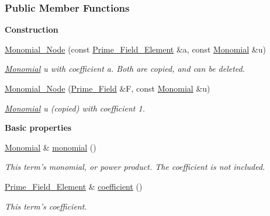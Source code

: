 \subsubsection*{Public Member Functions}
\begin{Indent}\textbf{ Construction}\par
\begin{DoxyCompactItemize}
\item 
\mbox{\label{group__polygroup_af979446eca6482aa603a53681a0c1ce9}} 
\hyperlink{group__polygroup_af979446eca6482aa603a53681a0c1ce9}{Monomial\+\_\+\+Node} (const \hyperlink{group___fields_group_class_prime___field___element}{Prime\+\_\+\+Field\+\_\+\+Element} \&a, const \hyperlink{group__polygroup_class_monomial}{Monomial} \&u)
\begin{DoxyCompactList}\small\item\em \hyperlink{group__polygroup_class_monomial}{Monomial} u with coefficient a. Both are copied, and can be deleted. \end{DoxyCompactList}\item 
\mbox{\label{group__polygroup_a4de7838dc51013c36fe23831249a8096}} 
\hyperlink{group__polygroup_a4de7838dc51013c36fe23831249a8096}{Monomial\+\_\+\+Node} (\hyperlink{group___fields_group_class_prime___field}{Prime\+\_\+\+Field} \&F, const \hyperlink{group__polygroup_class_monomial}{Monomial} \&u)
\begin{DoxyCompactList}\small\item\em \hyperlink{group__polygroup_class_monomial}{Monomial} u (copied) with coefficient 1. \end{DoxyCompactList}\end{DoxyCompactItemize}
\end{Indent}
\begin{Indent}\textbf{ Basic properties}\par
\begin{DoxyCompactItemize}
\item 
\mbox{\label{group__polygroup_ae2de10486486a056aa860ae8f133c309}} 
\hyperlink{group__polygroup_class_monomial}{Monomial} \& \hyperlink{group__polygroup_ae2de10486486a056aa860ae8f133c309}{monomial} ()
\begin{DoxyCompactList}\small\item\em This term's monomial, or power product. The coefficient is not included. \end{DoxyCompactList}\item 
\mbox{\label{group__polygroup_a9eaedcc01e0c081565981450d08379f4}} 
\hyperlink{group___fields_group_class_prime___field___element}{Prime\+\_\+\+Field\+\_\+\+Element} \& \hyperlink{group__polygroup_a9eaedcc01e0c081565981450d08379f4}{coefficient} ()
\begin{DoxyCompactList}\small\item\em This term's coefficient. \end{DoxyCompactList}\end{DoxyCompactItemize}
\end{Indent}
